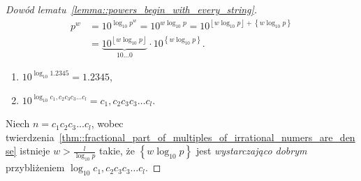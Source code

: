 \documentclass{beamer}
\newcommand{\enumsymbol}{$\triangleright$}
\newcommand{\floor}[1]{\left\lfloor #1 \right\rfloor}
\newcommand{\fracpart}[1]{\left\{ #1 \right\}}
\begin{document}
\begin{frame}
  \begin{proof}[Dowód lematu~\ref{lemma::powers_begin_with_every_string}]
    \begin{align*}
      p^w &= 10^{\log_{10}p^w} = 10^{w \log_{10} p} = 10^{\floor{w \log_{10} p} + \fracpart{w \log_{10} p}} \\
          &= \underbrace{10^{\floor{w \log_{10} p}}}_{10\ldots 0}\cdot10^{\fracpart{w \log_{10} p}}.
    \end{align*}
    \begin{enumerate}[label=\enumsymbol]
      \item $10^{\log_{10} 1.2345} = 1.2345$,
      \item $10^{\log_{10} c_1,c_2c_3c_3 \ldots{} c_l} = c_1,c_2c_3c_3 \ldots{} c_l$.
    \end{enumerate}
    Niech $n = c_1c_2c_3 \ldots{} c_l$, wobec twierdzenia~\ref{thm::fractional_part_of_multiples_of_irrational_numers_are_dense} istnieje $w > \frac{l}{\log_{10}p}$ takie, że
    $\fracpart{w \log_{10} p}$ jest \textit{wystarczająco dobrym} przybliżeniem $\log_{10}{c_1,c_2c_3c_3 \ldots{} c_l}$.  
  \end{proof}
  
\end{frame}
\end{document}
